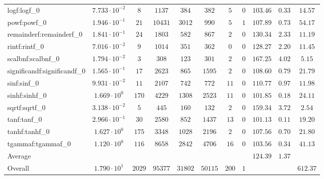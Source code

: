 \begin{tabular}{|l|c|c|c|c|c|c|c|c|c|c|}
logf:logf\_0                 & $ 7.733 \cdot 10^{-2} $ & $ 8      $ & $ 1137  $ & $ 384   $ & $ 382   $ & $ 5   $ & $ 0 $ & $ 103.46      $ & $ 0.33    $ & $ 14.57   $ \\
powf:powf\_0                 & $ 1.946 \cdot 10^{-1} $ & $ 21     $ & $ 10431 $ & $ 3012  $ & $ 990   $ & $ 5   $ & $ 1 $ & $ 107.89      $ & $ 0.73    $ & $ 54.17   $ \\
remainderf:remainderf\_0     & $ 1.841 \cdot 10^{-1} $ & $ 24     $ & $ 1803  $ & $ 582   $ & $ 867   $ & $ 2   $ & $ 0 $ & $ 130.34      $ & $ 2.33    $ & $ 11.19   $ \\
rintf:rintf\_0               & $ 7.016 \cdot 10^{-2} $ & $ 9      $ & $ 1014  $ & $ 351   $ & $ 362   $ & $ 0   $ & $ 0 $ & $ 128.27      $ & $ 2.20    $ & $ 11.45   $ \\
scalbnf:scalbnf\_0           & $ 1.794 \cdot 10^{-2} $ & $ 3      $ & $ 308   $ & $ 123   $ & $ 301   $ & $ 2   $ & $ 0 $ & $ 167.25      $ & $ 4.02    $ & $ 5.15    $ \\
significandf:significandf\_0 & $ 1.565 \cdot 10^{-1} $ & $ 17     $ & $ 2623  $ & $ 865   $ & $ 1595  $ & $ 2   $ & $ 0 $ & $ 108.60      $ & $ 0.79    $ & $ 21.79   $ \\
sinf:sinf\_0                 & $ 9.931 \cdot 10^{-2} $ & $ 11     $ & $ 2107  $ & $ 742   $ & $ 772   $ & $ 11  $ & $ 0 $ & $ 110.77      $ & $ 0.97    $ & $ 11.98   $ \\
sinhf:sinhf\_0               & $ 1.669 \cdot 10^{0}  $ & $ 170    $ & $ 4229  $ & $ 1308  $ & $ 2523  $ & $ 11  $ & $ 0 $ & $ 101.85      $ & $ 0.18    $ & $ 24.11   $ \\
sqrtf:sqrtf\_0               & $ 3.138 \cdot 10^{-2} $ & $ 5      $ & $ 445   $ & $ 160   $ & $ 132   $ & $ 2   $ & $ 0 $ & $ 159.34      $ & $ 3.72    $ & $ 2.54    $ \\
tanf:tanf\_0                 & $ 2.966 \cdot 10^{-1} $ & $ 30     $ & $ 2580  $ & $ 852   $ & $ 1437  $ & $ 13  $ & $ 0 $ & $ 101.13      $ & $ 0.11    $ & $ 19.20   $ \\
tanhf:tanhf\_0               & $ 1.627 \cdot 10^{0}  $ & $ 175    $ & $ 3348  $ & $ 1028  $ & $ 2196  $ & $ 2   $ & $ 0 $ & $ 107.56      $ & $ 0.70    $ & $ 21.80   $ \\
tgammaf:tgammaf\_0           & $ 1.120 \cdot 10^{0}  $ & $ 116    $ & $ 8658  $ & $ 2842  $ & $ 4706  $ & $ 16  $ & $ 0 $ & $ 103.56      $ & $ 0.34    $ & $ 41.13   $ \\
\hline
Average                      & $                     $ & $        $ & $       $ & $       $ & $       $ & $     $ & $   $ & $ 124.39      $ & $ 1.37    $ & $         $ \\
\hline
Overall                      & $ 1.790 \cdot 10^{1}  $ & $ 2029   $ & $ 95377 $ & $ 31802 $ & $ 50115 $ & $ 200 $ & $ 1 $ & $             $ & $         $ & $ 612.37  $ \\
\hline
\end{tabular}
